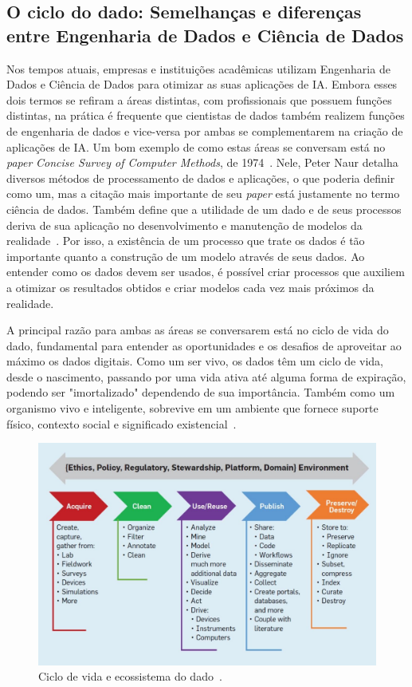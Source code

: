 \documentclass[portugues]{ic-tese}
\begin{document}
\subsection{O ciclo do dado: Semelhanças e diferenças entre Engenharia de Dados e Ciência de Dados}

Nos tempos atuais, empresas e instituições acadêmicas utilizam Engenharia de Dados e Ciência de Dados para otimizar as suas aplicações de IA. Embora esses dois termos se refiram a áreas distintas, com profissionais que possuem funções distintas, na prática é frequente que cientistas de dados também realizem funções de engenharia de dados e vice-versa por ambas se complementarem na criação de aplicações de IA. Um bom exemplo de como estas áreas se conversam está no \textit{paper} \textit{Concise Survey of Computer Methods}, de 1974~\citep{Panoply_2017}. Nele, Peter Naur detalha diversos métodos de processamento de dados e aplicações, o que poderia definir como um, mas a citação mais importante de seu \textit{paper} está justamente no termo ciência de dados. Também define que a utilidade de um dado e de seus processos deriva de sua aplicação no desenvolvimento e manutenção de modelos da realidade~\citep{Foote_2021}. Por isso, a existência de um processo que trate os dados é tão importante quanto a construção de um modelo através de seus dados. Ao entender como os dados devem ser usados, é possível criar processos que auxiliem a otimizar os resultados obtidos e criar modelos cada vez mais próximos da realidade.

A principal razão para ambas as áreas se conversarem está no ciclo de vida do dado, fundamental para entender as oportunidades e os desafios de aproveitar ao máximo os dados digitais. Como um ser vivo, os dados têm um ciclo de vida, desde o nascimento, passando por uma vida ativa até alguma forma de expiração, podendo ser "imortalizado" dependendo de sua importância. Também como um organismo vivo e inteligente, sobrevive em um ambiente que fornece suporte físico, contexto social e significado existencial~\citep{Berman_2018}.

\begin{figure}[h]
\centering
\includegraphics[scale=0.6]{images/data_life_cycle.jpg}
\caption {Ciclo de vida e ecossistema do dado~\citep{Berman_2018}.}
\label{fig:cicloDado}
\end{figure}
\end{document}
